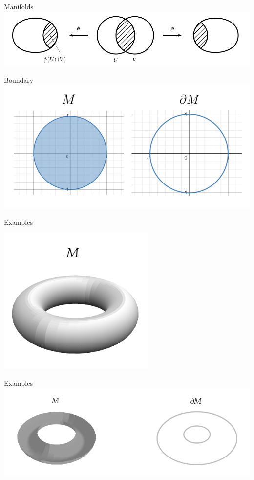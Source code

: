 \documentclass[9pt]{beamer}
\begin{document}
\begin{frame}{Manifolds}
    \includegraphics[scale=0.55]{compatible.PNG}

\end{frame}

\begin{frame}{Boundary}
    \includegraphics[scale=0.6]{boundaryPNG.PNG}
\end{frame}

\begin{frame}{Examples}
    \begin{center}  
    \includegraphics[scale=0.6]{torus.png}
    \end{center}
\end{frame}

\begin{frame}{Examples}
    \includegraphics[scale=0.6]{torus1.PNG}
\end{frame}
\end{document}
